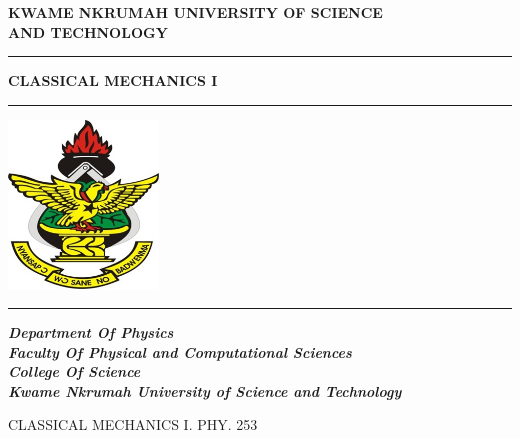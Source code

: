 \documentclass[a4paper,12pt]{article}
\begin{document}
\begin{center}
\textbf{\Large{KWAME NKRUMAH UNIVERSITY OF SCIENCE}} \\
\vspace{0.4cm}
\textbf{\Large{AND TECHNOLOGY}} \\
\rule{\linewidth}{0.4pt} %
\end{center}

\vspace{1.5cm}

\begin{center}
\textbf{\LARGE{CLASSICAL MECHANICS I}} \\
\rule{0.6\linewidth}{0.4pt}
\end{center}

\vspace{1.5cm}

\begin{center}
\includegraphics[width=0.3\textwidth]{logo.jpg}
\end{center}
\rule{\linewidth}{0.3pt}

\vspace{1.5cm}

\begin{center}
\large{\textbf{\textit{
Department Of Physics \\
Faculty Of Physical and Computational Sciences \\
College Of Science \\
Kwame Nkrumah University of Science and Technology
}}}
\end{center}




\begin{thanks}
CLASSICAL MECHANICS I. PHY. 253
\end{thanks}
\newpage
\end{document}
